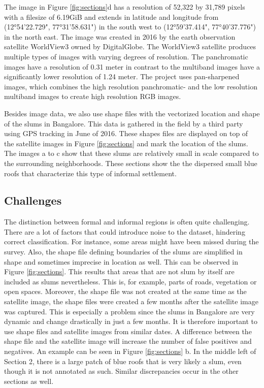 The image in Figure \ref{fig:sections}d has a resolution of 52,322 by 31,789 pixels with a filesize of 6.19GiB and extends in latitude and longitude from  (12°54'22.729", 77°31'58.631") in the south west to (12°59'37.414", 77°40'37.776") in the north east. The image was created in 2016 by the earth observation satellite WorldView3 owned by DigitalGlobe. The WorldView3 satellite produces multiple types of images with varying degrees of resolution. The panchromatic images have a resolution of 0.31 meter in contrast to  the multiband images have a significantly lower resolution of 1.24 meter. The project uses pan-sharpened images, which combines the high resolution panchromatic- and the low resolution multiband images to create high resolution RGB images.

Besides image data, we also use shape files with the vectorized location and shape of the slums in Bangalore. This data is gathered in the field by a third party using GPS tracking in June of 2016. These shapes files are displayed on top of the satellite images in Figure \ref{fig:sections} and mark the location of the slums. The images a to c show that these slums are relatively small in scale compared to the surrounding neighborhoods. These sections show the the dispersed small blue roofs that characterize this type of informal settlement. 

\subsection{Challenges}

The distinction between formal and informal regions is often quite challenging. There are a lot of factors that could introduce noise to the dataset, hindering correct classification. For instance, some areas might have been missed during the survey. Also, the shape file defining boundaries of the slums are simplified in shape and sometimes imprecise in location as well. This can be observed in Figure \ref{fig:sections}. This results that areas that are not slum by itself are included as slums nevertheless. This is, for example, parts of roads, vegetation or open spaces. Moreover, the shape file was not created at the same time as the satellite image, the shape files were created a few months after the satellite image was captured. This is especially a problem since the slums in Bangalore are very dynamic and change drastically in just a few months. It is therefore important to use shape files and satellite images from similar dates. A difference between the shape file and the satellite image will increase the number of false positives and negatives. An example can be seen in Figure \ref{fig:sections} b. In the middle left of Section 2, there is a large patch of blue roofs that is very likely a slum, even though it is not annotated as such. Similar discrepancies occur in the other sections as well. 

